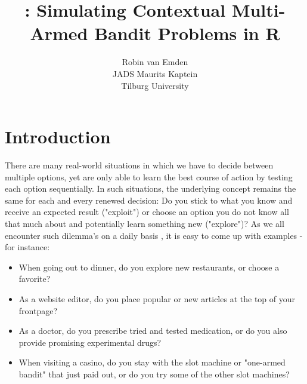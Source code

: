 \documentclass{jss}
\author{Robin van Emden\\JADS \And
  Maurits Kaptein\\Tilburg University}
\title{\pkg{contextual}: Simulating Contextual Multi-Armed Bandit Problems in R}
\begin{document}
\sloppy



\section{Introduction} \label{intro}

There are many real-world situations in which we have to decide between multiple options, yet are only able to learn the best course of action by testing each option sequentially. In such situations, the underlying concept remains the same for each and every renewed decision: Do you stick to what you know and receive an expected result ("exploit") or choose an option you do not know all that much about and potentially learn something new ("explore")? As we all encounter such dilemma's on a daily basis \citep{Wilson2014}, it is easy to come up with examples - for instance:

\begin{itemize}
\item When going out to dinner, do you explore new restaurants, or choose a favorite?
\item As a website editor, do you place popular or new articles at the top of your frontpage?
\item As a doctor, do you prescribe tried and tested medication, or do you also provide promising experimental drugs?
\item When visiting a casino, do you stay with the slot machine or "one-armed bandit" that just paid out, or do you try some of the other slot machines?
\end{itemize}
\end{document}
